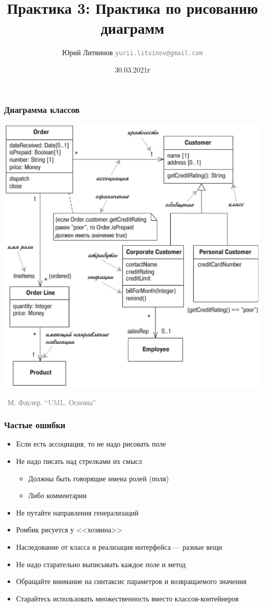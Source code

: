 \documentclass[xetex,mathserif,serif]{beamer}
\title{Практика 3: Практика по рисованию диаграмм}
\author[Юрий Литвинов]{Юрий Литвинов \newline \textcolor{gray}{\small\texttt{yurii.litvinov@gmail.com}}}
\date{30.03.2021г}
\newcommand{\attribution}[1] {
    \vspace{-5mm}\begin{flushright}\begin{scriptsize}\textcolor{gray}{\textcopyright\, #1}\end{scriptsize}\end{flushright}
}
\begin{document}
    \frame{\titlepage}

    \begin{frame}
        \frametitle{Диаграмма классов}
        \begin{center}
            \includegraphics[height=0.8\textheight]{umlClassDiagram.png}
            \attribution{М. Фаулер. ``UML. Основы''}
        \end{center}
    \end{frame}

    \begin{frame}
        \frametitle{Частые ошибки}
        \begin{itemize}
            \item Если есть ассоциация, то не надо рисовать поле
            \item Не надо писать над стрелками их смысл
            \begin{itemize}
                \item Должны быть говорящие имена ролей (поля)
                \item Либо комментарии
            \end{itemize}
            \item Не путайте направления генерализаций
            \item Ромбик рисуется у <<хозяина>>
            \item Наследование от класса и реализация интерфейса --- разные вещи
            \item Не надо старательно выписывать каждое поле и метод
            \item Обращайте внимание на синтаксис параметров и возвращаемого значения
            \item Старайтесь использовать множественность вместо классов-контейнеров
        \end{itemize}
    \end{frame}
\end{document}
